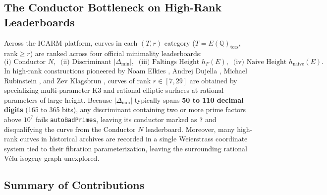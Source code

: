 \documentclass[10pt,a4paper]{article}
\theoremstyle{plain}
\theoremstyle{definition}
\theoremstyle{remark}
\begin{document}
\subsection{The Conductor Bottleneck on High-Rank Leaderboards}

Across the ICARM platform, curves in each $(T, r)$ category ($T = E(\mathbb{Q})_{\text{tors}}$, $\mathrm{rank} \ge r$) are ranked across four official minimality leaderboards:
\begin{equation}
\text{(i) Conductor } N, \;\; \text{(ii) Discriminant } |\Delta_{\min}|, \;\; \text{(iii) Faltings Height } h_F(E), \;\; \text{(iv) Naive Height } h_{\text{naive}}(E).
\end{equation}
In high-rank constructions pioneered by Noam Elkies \cite{elkies2006high,elkies2024rank29}, Andrej Dujella \cite{dujella2024highrank}, Michael Rubinstein \cite{rubinstein2024tables}, and Zev Klagsbrun \cite{elkies2024rank29}, curves of rank $r \in [7, 29]$ are obtained by specializing multi-parameter K3 and rational elliptic surfaces at rational parameters of large height. Because $|\Delta_{\min}|$ typically spans \textbf{50 to 110 decimal digits} (165 to 365 bits), any discriminant containing two or more prime factors above $10^7$ fails \texttt{autoBadPrimes}, leaving its conductor marked as \texttt{?} and disqualifying the curve from the Conductor $N$ leaderboard. Moreover, many high-rank curves in historical archives are recorded in a single Weierstrass coordinate system tied to their fibration parameterization, leaving the surrounding rational V\'{e}lu isogeny graph unexplored.

\subsection{Summary of Contributions}
\end{document}
